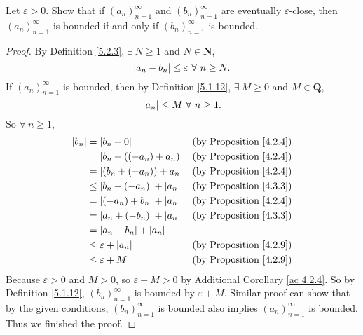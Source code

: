 \begin{exercise}\label{ex 5.2.2}
    Let \(\varepsilon > 0\).
    Show that if \((a_n)_{n = 1}^{\infty}\) and \((b_n)_{n = 1}^{\infty}\) are eventually \(\varepsilon\)-close, then \((a_n)_{n = 1}^{\infty}\) is bounded if and only if \((b_n)_{n = 1}^{\infty}\) is bounded.
\end{exercise}

\begin{proof}
    By Definition \ref{5.2.3}, \(\exists\ N \geq 1\) and \(N \in \mathbf{N}\),
    \[
        \abs*{a_n - b_n} \leq \varepsilon \ \forall\ n \geq N.
    \]
    If \((a_n)_{n = 1}^{\infty}\) is bounded, then by Definition \ref{5.1.12}, \(\exists\ M \geq 0\) and \(M \in \mathbf{Q}\),
    \[
        \abs*{a_n} \leq M \ \forall\ n \geq 1.
    \]
    So \(\forall\ n \geq 1\),
    \begin{align*}
        \abs*{b_n} & = \abs*{b_n + 0}                      & \text{(by Proposition \ref{4.2.4})} \\
                   & = \abs*{b_n + ((-a_n) + a_n)}         & \text{(by Proposition \ref{4.2.4})} \\
                   & = \abs*{(b_n + (-a_n)) + a_n}         & \text{(by Proposition \ref{4.2.4})} \\
                   & \leq \abs*{b_n + (-a_n)} + \abs*{a_n} & \text{(by Proposition \ref{4.3.3})} \\
                   & = \abs*{(-a_n) + b_n} + \abs*{a_n}    & \text{(by Proposition \ref{4.2.4})} \\
                   & = \abs*{a_n + (-b_n)} + \abs*{a_n}    & \text{(by Proposition \ref{4.3.3})} \\
                   & = \abs*{a_n - b_n} + \abs*{a_n}                                             \\
                   & \leq \varepsilon + \abs*{a_n}         & \text{(by Proposition \ref{4.2.9})} \\
                   & \leq \varepsilon + M                  & \text{(by Proposition \ref{4.2.9})} \\
    \end{align*}
    Because \(\varepsilon > 0\) and \(M > 0\), so \(\varepsilon + M > 0\) by Additional Corollary \ref{ac 4.2.4}.
    So by Definition \ref{5.1.12}, \((b_n)_{n = 1}^{\infty}\) is bounded by \(\varepsilon + M\).
    Similar proof can show that by the given conditions, \((b_n)_{n = 1}^{\infty}\) is bounded also implies \((a_n)_{n = 1}^{\infty}\) is bounded.
    Thus we finished the proof.
\end{proof}